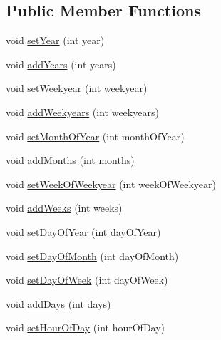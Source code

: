 \subsection*{Public Member Functions}
\begin{DoxyCompactItemize}
\item 
void \hyperlink{interfaceorg_1_1joda_1_1time_1_1_read_writable_date_time_a3ab8a1fb96736dd230f0e56707a732c6}{set\-Year} (int year)
\item 
void \hyperlink{interfaceorg_1_1joda_1_1time_1_1_read_writable_date_time_a976c5abfdde09358f053650ce1de7ab6}{add\-Years} (int years)
\item 
void \hyperlink{interfaceorg_1_1joda_1_1time_1_1_read_writable_date_time_a3c6ed658f73cb531967456defd5cfaf4}{set\-Weekyear} (int weekyear)
\item 
void \hyperlink{interfaceorg_1_1joda_1_1time_1_1_read_writable_date_time_a2e7779cab2ac51ed13e5fd9e88181f87}{add\-Weekyears} (int weekyears)
\item 
void \hyperlink{interfaceorg_1_1joda_1_1time_1_1_read_writable_date_time_a99226d93731f198627d15e7f376568c6}{set\-Month\-Of\-Year} (int month\-Of\-Year)
\item 
void \hyperlink{interfaceorg_1_1joda_1_1time_1_1_read_writable_date_time_a21bf24f872205049e02e302fce934c2f}{add\-Months} (int months)
\item 
void \hyperlink{interfaceorg_1_1joda_1_1time_1_1_read_writable_date_time_aba5219bcf6860d47fea004fd121852c4}{set\-Week\-Of\-Weekyear} (int week\-Of\-Weekyear)
\item 
void \hyperlink{interfaceorg_1_1joda_1_1time_1_1_read_writable_date_time_ae49036e9c5dec518757927fa7066ccb4}{add\-Weeks} (int weeks)
\item 
void \hyperlink{interfaceorg_1_1joda_1_1time_1_1_read_writable_date_time_a2ea1a2583ba6a03ba1b7235e4494f812}{set\-Day\-Of\-Year} (int day\-Of\-Year)
\item 
void \hyperlink{interfaceorg_1_1joda_1_1time_1_1_read_writable_date_time_a925bb92b113dbeea25f13011c8689fd2}{set\-Day\-Of\-Month} (int day\-Of\-Month)
\item 
void \hyperlink{interfaceorg_1_1joda_1_1time_1_1_read_writable_date_time_a8cc2b018bceb56a7d3f9188b357c9bdf}{set\-Day\-Of\-Week} (int day\-Of\-Week)
\item 
void \hyperlink{interfaceorg_1_1joda_1_1time_1_1_read_writable_date_time_a657a26d00cc2282817512c2b20666561}{add\-Days} (int days)
\item 
void \hyperlink{interfaceorg_1_1joda_1_1time_1_1_read_writable_date_time_a3d248308bbbdc36929466fa426ff32f7}{set\-Hour\-Of\-Day} (int hour\-Of\-Day)

\end{DoxyCompactItemize}
